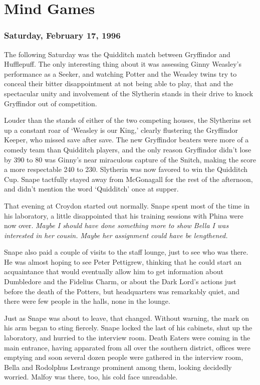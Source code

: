 
\chapter{Mind Games}

\subsection{Saturday, February 17, 1996}

The following Saturday was the Quidditch match between Gryffindor and Hufflepuff. The only interesting thing about it was assessing Ginny Weasley's performance as a Seeker, and watching Potter and the Weasley twins try to conceal their bitter disappointment at not being able to play, that and the spectacular unity and involvement of the Slytherin stands in their drive to knock Gryffindor out of competition.

Louder than the stands of either of the two competing houses, the Slytherins set up a constant roar of `Weasley is our King,' clearly flustering the Gryffindor Keeper, who missed save after save. The new Gryffindor beaters were more of a comedy team than Quidditch players, and the only reason Gryffindor didn't lose by 390 to 80 was Ginny's near miraculous capture of the Snitch, making the score a more respectable 240 to 230. Slytherin was now favored to win the Quidditch Cup. Snape tactfully stayed away from McGonagall for the rest of the afternoon, and didn't mention the word `Quidditch' once at supper.

That evening at Croydon started out normally. Snape spent most of the time in his laboratory, a little disappointed that his training sessions with Phina were now over. \emph{Maybe I should have done something more to show Bella I was interested in her cousin. Maybe her assignment could have be lengthened.}

Snape also paid a couple of visits to the staff lounge, just to see who was there. He was almost hoping to see Peter Pettigrew, thinking that he could start an acquaintance that would eventually allow him to get information about Dumbledore and the Fidelius Charm, or about the Dark Lord's actions just before the death of the Potters, but headquarters was remarkably quiet, and there were few people in the halls, none in the lounge.

Just as Snape was about to leave, that changed. Without warning, the mark on his arm began to sting fiercely. Snape locked the last of his cabinets, shut up the laboratory, and hurried to the interview room. Death Eaters were coming in the main entrance, having apparated from all over the southern district, offices were emptying and soon several dozen people were gathered in the interview room, Bella and Rodolphus Lestrange prominent among them, looking decidedly worried. Malfoy was there, too, his cold face unreadable.

